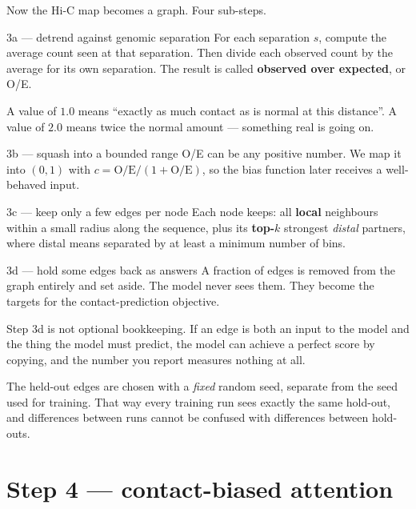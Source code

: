 \documentclass[11pt,a4paper]{article}
\newcommand{\term}[1]{\textcolor{deepblue}{\textbf{#1}}}
\begin{document}
Now the Hi-C map becomes a graph. Four sub-steps.

\begin{stepbox}{3a --- detrend against genomic separation}
For each separation $s$, compute the average count seen at that separation. Then
divide each observed count by the average for its own separation. The result is
called \term{observed over expected}, or O/E.

A value of $1.0$ means ``exactly as much contact as is normal at this distance''.
A value of $2.0$ means twice the normal amount --- something real is going on.
\end{stepbox}

\begin{stepbox}{3b --- squash into a bounded range}
O/E can be any positive number. We map it into $(0,1)$ with
$c = \text{O/E} / (1 + \text{O/E})$, so the bias function later receives a
well-behaved input.
\end{stepbox}

\begin{stepbox}{3c --- keep only a few edges per node}
Each node keeps: all \term{local} neighbours within a small radius along the
sequence, plus its \term{top-$k$} strongest \emph{distal} partners, where distal
means separated by at least a minimum number of bins.
\end{stepbox}

\begin{stepbox}{3d --- hold some edges back as answers}
A fraction of edges is removed from the graph entirely and set aside. The model
never sees them. They become the targets for the contact-prediction objective.
\end{stepbox}

\begin{carefulbox}
Step 3d is not optional bookkeeping. If an edge is both an input to the model and
the thing the model must predict, the model can achieve a perfect score by
copying, and the number you report measures nothing at all.

The held-out edges are chosen with a \emph{fixed} random seed, separate from the
seed used for training. That way every training run sees exactly the same
hold-out, and differences between runs cannot be confused with differences
between hold-outs.
\end{carefulbox}

\section{Step 4 --- contact-biased attention}
\label{sec:bias}
\end{document}
